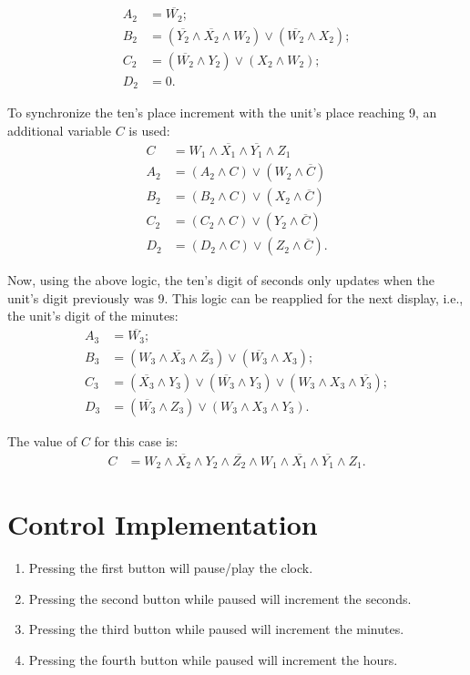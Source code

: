 \documentclass[conference]{IEEEtran}
\begin{document}
\begin{align}
    A_2 &= \overline{W_2};\\
    B_2 &= (\overline{Y_2} \land \overline{X_2} \land W_2) \lor (\overline{W_2} \land X_2);\\
    C_2 &= (\overline{W_2} \land Y_2) \lor (X_2 \land W_2);\\
    D_2 &= 0.
\end{align}

To synchronize the ten's place increment with the unit's place reaching 9, an additional variable $C$ is used:
\begin{align}
    C &= W_1 \land \overline{X_1} \land \overline{Y_1} \land Z_1 \\
    A_2 &= (A_2 \land C) \lor (W_2 \land \overline{C}) \\
    B_2 &= (B_2 \land C) \lor (X_2 \land \overline{C}) \\
    C_2 &= (C_2 \land C) \lor (Y_2 \land \overline{C}) \\
    D_2 &= (D_2 \land C) \lor (Z_2 \land \overline{C}).
\end{align}

Now, using the above logic, the ten's digit of seconds only updates when the unit's digit previously was 9. This logic can be reapplied for the next display, i.e., the unit's digit of the minutes:
\begin{align}
    A_3 &= \overline{W_3}; \\
    B_3 &= (W_3 \land \overline{X_3} \land \overline{Z_3}) \lor (\overline{W_3} \land X_3);\\
    C_3 &= (\overline{X_3} \land Y_3) \lor (\overline{W_3} \land Y_3) \lor (W_3 \land X_3 \land \overline{Y_3});\\
    D_3 &= (\overline{W_3} \land Z_3) \lor (W_3 \land X_3 \land Y_3).
\end{align}

The value of $C$ for this case is:
\begin{align}
    C &= W_2 \land \overline{X_2} \land Y_2 \land \overline{Z_2} \land W_1 \land \overline{X_1} \land \overline{Y_1} \land Z_1.
\end{align}

\section{Control Implementation}
\begin{enumerate}
    \item Pressing the first button will pause/play the clock.
    \item Pressing the second button while paused will increment the seconds.
    \item Pressing the third button while paused will increment the minutes.
    \item Pressing the fourth button while paused will increment the hours.
\end{enumerate}
\end{document}
